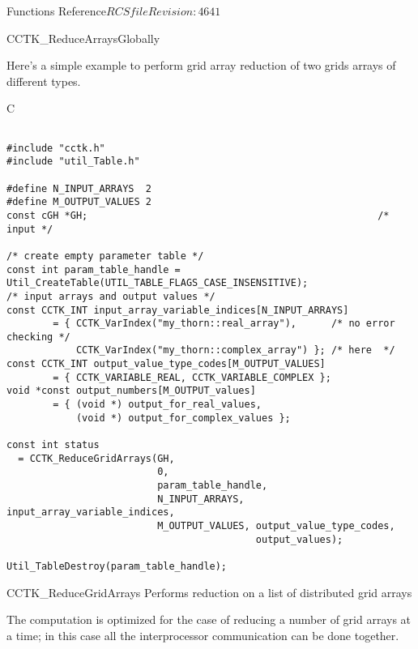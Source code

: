 \begin{cactuspart}{ Functions Reference}{$RCSfile$}{$Revision: 4641 $}
\begin{FunctionDescription}{CCTK\_ReduceArraysGlobally}
\begin{ExampleSection}
\begin{ExampleDescription}
Here's a simple example to perform grid array reduction of two grids arrays of different types.
\end{ExampleDescription}
\begin{Example}{C}
\begin{verbatim}

#include "cctk.h"
#include "util_Table.h"

#define N_INPUT_ARRAYS  2
#define M_OUTPUT_VALUES 2
const cGH *GH;                                                  /* input */

/* create empty parameter table */
const int param_table_handle = Util_CreateTable(UTIL_TABLE_FLAGS_CASE_INSENSITIVE);
/* input arrays and output values */
const CCTK_INT input_array_variable_indices[N_INPUT_ARRAYS]
        = { CCTK_VarIndex("my_thorn::real_array"),      /* no error checking */
            CCTK_VarIndex("my_thorn::complex_array") }; /* here  */
const CCTK_INT output_value_type_codes[M_OUTPUT_VALUES]
        = { CCTK_VARIABLE_REAL, CCTK_VARIABLE_COMPLEX };
void *const output_numbers[M_OUTPUT_values]
        = { (void *) output_for_real_values,
            (void *) output_for_complex_values };

const int status
  = CCTK_ReduceGridArrays(GH,
                          0,
                          param_table_handle,
                          N_INPUT_ARRAYS, input_array_variable_indices,
                          M_OUTPUT_VALUES, output_value_type_codes,
                                           output_values);

Util_TableDestroy(param_table_handle);
\end{verbatim}
\end{Example}
\end{ExampleSection}
\end{FunctionDescription}




\begin{FunctionDescription}{CCTK\_ReduceGridArrays}
\label{CCTK-ReduceGridArrays}
Performs reduction on a list of distributed grid arrays

The computation is optimized for the case of reducing a
number of grid arrays at a time; in this case all the interprocessor
communication can be done together.


\end{FunctionDescription}
\end{cactuspart}
